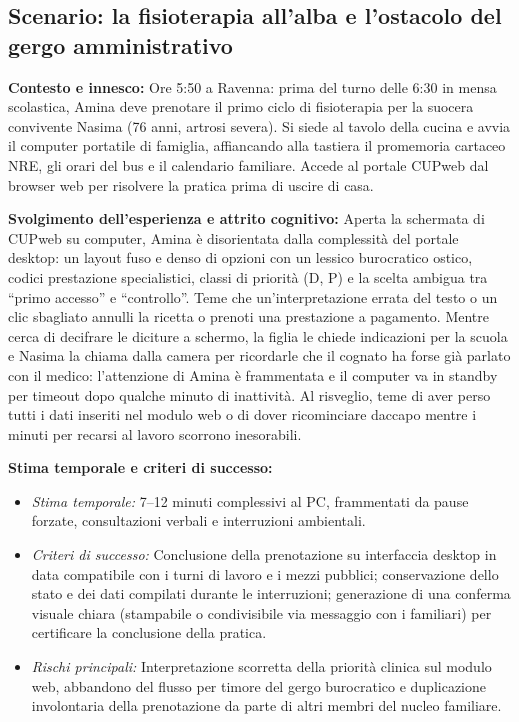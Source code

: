 \clearpage

\subsection[Scenario e obiettivo]{Scenario: la fisioterapia all'alba e l'ostacolo del gergo amministrativo}

\textbf{Contesto e innesco:} Ore 5:50 a Ravenna: prima del turno delle 6:30 in mensa scolastica, Amina deve prenotare il primo ciclo di fisioterapia per la suocera convivente Nasima (76 anni, artrosi severa). Si siede al tavolo della cucina e avvia il computer portatile di famiglia, affiancando alla tastiera il promemoria cartaceo NRE, gli orari del bus e il calendario familiare. Accede al portale CUPweb dal browser web per risolvere la pratica prima di uscire di casa.

\textbf{Svolgimento dell'esperienza e attrito cognitivo:} Aperta la schermata di CUPweb su computer, Amina è disorientata dalla complessità del portale desktop: un layout fuso e denso di opzioni con un lessico burocratico ostico, codici prestazione specialistici, classi di priorità (D, P) e la scelta ambigua tra \enquote{primo accesso} e \enquote{controllo}. Teme che un'interpretazione errata del testo o un clic sbagliato annulli la ricetta o prenoti una prestazione a pagamento. Mentre cerca di decifrare le diciture a schermo, la figlia le chiede indicazioni per la scuola e Nasima la chiama dalla camera per ricordarle che il cognato ha forse già parlato con il medico: l'attenzione di Amina è frammentata e il computer va in standby per timeout dopo qualche minuto di inattività. Al risveglio, teme di aver perso tutti i dati inseriti nel modulo web o di dover ricominciare daccapo mentre i minuti per recarsi al lavoro scorrono inesorabili.

\textbf{Stima temporale e criteri di successo:}
\begin{itemize}[leftmargin=*,topsep=1.5pt,itemsep=0.5pt,parsep=0pt]
\item \textit{Stima temporale:} 7--12 minuti complessivi al PC, frammentati da pause forzate, consultazioni verbali e interruzioni ambientali.
\item \textit{Criteri di successo:} Conclusione della prenotazione su interfaccia desktop in data compatibile con i turni di lavoro e i mezzi pubblici; conservazione dello stato e dei dati compilati durante le interruzioni; generazione di una conferma visuale chiara (stampabile o condivisibile via messaggio con i familiari) per certificare la conclusione della pratica.
\item \textit{Rischi principali:} Interpretazione scorretta della priorità clinica sul modulo web, abbandono del flusso per timore del gergo burocratico e duplicazione involontaria della prenotazione da parte di altri membri del nucleo familiare.
\end{itemize}

